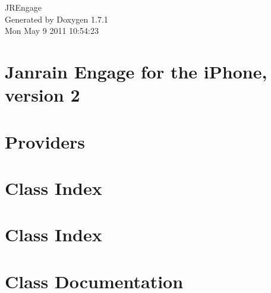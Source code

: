 \documentclass[a4paper]{book}
\begin{document}
\hypersetup{pageanchor=false}
\begin{titlepage}
\vspace*{7cm}
\begin{center}
{\Large JREngage }\\
\vspace*{1cm}
{\large Generated by Doxygen 1.7.1}\\
\vspace*{0.5cm}
{\small Mon May 9 2011 10:54:23}\\
\end{center}
\end{titlepage}
\clearemptydoublepage
{}
\tableofcontents
\clearemptydoublepage
{}
\hypersetup{pageanchor=true}
\chapter{Janrain Engage for the iPhone, version 2}
\label{index}\hypertarget{index}{}
\chapter{Providers}
\label{Providers}
\hypertarget{Providers}{}

\chapter{Class Index}

\chapter{Class Index}

\chapter{Class Documentation}










\printindex
\end{document}
